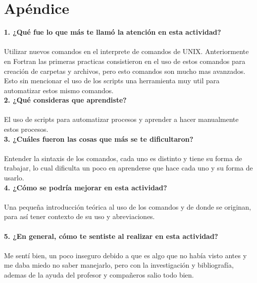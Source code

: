 \documentclass[12pt]{article}
\begin{document}
\section{Apéndice}
\noindent\textbf {1. ¿Qué fue lo que más te llamó la atención en esta actividad?} \\ \\
Utilizar nuevos comandos en el interprete de comandos de UNIX. Anteriormente en Fortran las primeras practicas consistieron en el uso de estos comandos para creación de carpetas y archivos, pero esto comandos son mucho mas avanzados. Esto sin mencionar el uso de los scripts una herramienta muy util para automatizar estos mismo comandos. \\

\noindent\textbf {2. ¿Qué consideras que aprendiste?}\\ \\
El uso de scripts para automatizar procesos y aprender a hacer manualmente estos procesos. \\ 

\noindent\textbf {3. ¿Cuáles fueron las cosas que más se te dificultaron? } \\ \\
Entender la sintaxis de los comandos, cada uno es distinto y tiene  su forma de trabajar, lo cual dificulta un poco en aprenderse que hace cada uno y su forma de usarlo. \\

\noindent\textbf {4. ¿Cómo se podría mejorar en esta actividad?} \\ \\
Una pequeña introducción teórica al uso de los comandos y de donde se originan, para así tener contexto de su uso y abreviaciones. \\ \\

\noindent\textbf {5. ¿En general, cómo te sentiste al realizar en esta actividad? }\\  \\
Me sentí bien, un poco inseguro debido a que es algo que no había visto antes y me daba miedo no saber manejarlo, pero con la investigación y bibliografía, ademas de la ayuda del profesor y compañeros salio todo bien.
\end{document}
